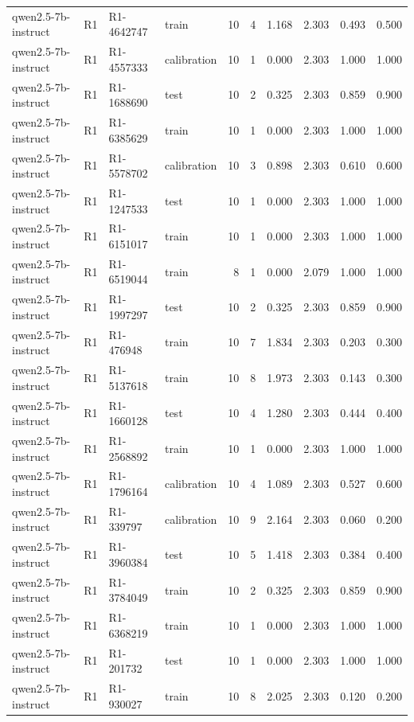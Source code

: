 \begin{table}
\begin{tabular}{llllrrrrrr}
qwen2.5-7b-instruct & R1 & R1-4642747 & train & 10 & 4 & 1.168 & 2.303 & 0.493 & 0.500 \\
qwen2.5-7b-instruct & R1 & R1-4557333 & calibration & 10 & 1 & 0.000 & 2.303 & 1.000 & 1.000 \\
qwen2.5-7b-instruct & R1 & R1-1688690 & test & 10 & 2 & 0.325 & 2.303 & 0.859 & 0.900 \\
qwen2.5-7b-instruct & R1 & R1-6385629 & train & 10 & 1 & 0.000 & 2.303 & 1.000 & 1.000 \\
qwen2.5-7b-instruct & R1 & R1-5578702 & calibration & 10 & 3 & 0.898 & 2.303 & 0.610 & 0.600 \\
qwen2.5-7b-instruct & R1 & R1-1247533 & test & 10 & 1 & 0.000 & 2.303 & 1.000 & 1.000 \\
qwen2.5-7b-instruct & R1 & R1-6151017 & train & 10 & 1 & 0.000 & 2.303 & 1.000 & 1.000 \\
qwen2.5-7b-instruct & R1 & R1-6519044 & train & 8 & 1 & 0.000 & 2.079 & 1.000 & 1.000 \\
qwen2.5-7b-instruct & R1 & R1-1997297 & test & 10 & 2 & 0.325 & 2.303 & 0.859 & 0.900 \\
qwen2.5-7b-instruct & R1 & R1-476948 & train & 10 & 7 & 1.834 & 2.303 & 0.203 & 0.300 \\
qwen2.5-7b-instruct & R1 & R1-5137618 & train & 10 & 8 & 1.973 & 2.303 & 0.143 & 0.300 \\
qwen2.5-7b-instruct & R1 & R1-1660128 & test & 10 & 4 & 1.280 & 2.303 & 0.444 & 0.400 \\
qwen2.5-7b-instruct & R1 & R1-2568892 & train & 10 & 1 & 0.000 & 2.303 & 1.000 & 1.000 \\
qwen2.5-7b-instruct & R1 & R1-1796164 & calibration & 10 & 4 & 1.089 & 2.303 & 0.527 & 0.600 \\
qwen2.5-7b-instruct & R1 & R1-339797 & calibration & 10 & 9 & 2.164 & 2.303 & 0.060 & 0.200 \\
qwen2.5-7b-instruct & R1 & R1-3960384 & test & 10 & 5 & 1.418 & 2.303 & 0.384 & 0.400 \\
qwen2.5-7b-instruct & R1 & R1-3784049 & train & 10 & 2 & 0.325 & 2.303 & 0.859 & 0.900 \\
qwen2.5-7b-instruct & R1 & R1-6368219 & train & 10 & 1 & 0.000 & 2.303 & 1.000 & 1.000 \\
qwen2.5-7b-instruct & R1 & R1-201732 & test & 10 & 1 & 0.000 & 2.303 & 1.000 & 1.000 \\
qwen2.5-7b-instruct & R1 & R1-930027 & train & 10 & 8 & 2.025 & 2.303 & 0.120 & 0.200 \\

\end{tabular}
\end{table}
